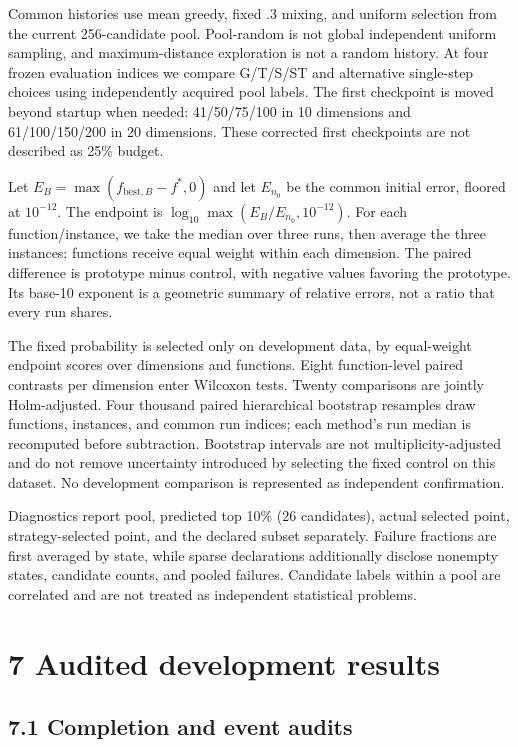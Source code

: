 \documentclass[11pt,a4paper]{article}
\begin{document}
Common histories use mean greedy, fixed .3 mixing, and uniform selection
from the current 256-candidate pool. Pool-random is not global
independent uniform sampling, and maximum-distance exploration is not a
random history. At four frozen evaluation indices we compare G/T/S/ST
and alternative single-step choices using independently acquired pool
labels. The first checkpoint is moved beyond startup when needed:
41/50/75/100 in 10 dimensions and 61/100/150/200 in 20 dimensions. These
corrected first checkpoints are not described as 25\% budget.

Let \(E_B=\max(f_{\mathrm{best},B}-f^*,0)\) and let \(E_{n_0}\) be the
common initial error, floored at \(10^{-12}\). The endpoint is
\(\log_{10}\max(E_B/E_{n_0},10^{-12})\). For each function/instance, we
take the median over three runs, then average the three instances;
functions receive equal weight within each dimension. The paired
difference is prototype minus control, with negative values favoring the
prototype. Its base-10 exponent is a geometric summary of relative
errors, not a ratio that every run shares.

The fixed probability is selected only on development data, by
equal-weight endpoint scores over dimensions and functions. Eight
function-level paired contrasts per dimension enter Wilcoxon tests.
Twenty comparisons are jointly Holm-adjusted. Four thousand paired
hierarchical bootstrap resamples draw functions, instances, and common
run indices; each method's run median is recomputed before subtraction.
Bootstrap intervals are not multiplicity-adjusted and do not remove
uncertainty introduced by selecting the fixed control on this dataset.
No development comparison is represented as independent confirmation.

Diagnostics report pool, predicted top 10\% (26 candidates), actual
selected point, strategy-selected point, and the declared subset
separately. Failure fractions are first averaged by state, while sparse
declarations additionally disclose nonempty states, candidate counts,
and pooled failures. Candidate labels within a pool are correlated and
are not treated as independent statistical problems.

\hypertarget{audited-development-results}{%
\section{7 Audited development
results}\label{audited-development-results}}

\hypertarget{completion-and-event-audits}{%
\subsection{7.1 Completion and event
audits}\label{completion-and-event-audits}}
\end{document}
